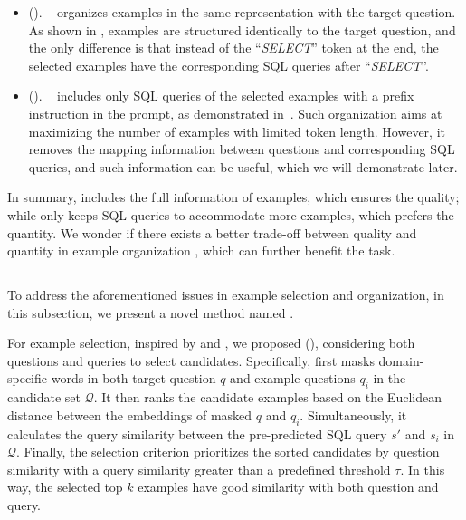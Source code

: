 \begin{itemize}
    \item \textbf{\fiorg} (\abfiorg). 
    \abfiorg~\cite{enhancing, DBLP:journals/corr/abs-2305-11853} organizes examples in the same representation with the target question.  
    As shown in , examples are structured identically to the target question, and the only difference is that instead of the ``\textit{SELECT}'' token at the end, the selected examples have the corresponding SQL queries after ``\textit{SELECT}''. 
    \item \textbf{\sqlorg} (\absqlorg).
    \absqlorg~\cite{DBLP:journals/corr/abs-2304-13301} includes only SQL queries of the selected examples with a prefix instruction in the prompt, as demonstrated in~.
    Such organization aims at maximizing the number of examples with limited token length. 
    However, it removes the mapping information between questions and corresponding SQL queries, and such information can be useful, which we will demonstrate later.
\end{itemize}

In summary, \abfiorg includes the full information of examples, which ensures the quality; 
while \absqlorg only keeps SQL queries to accommodate more examples, which prefers the quantity. 
We wonder if there exists a better trade-off between quality and quantity in example organization
, which can further benefit the \nlsql task.

\subsection{\ours}
\label{sec:dail-sql}
To address the aforementioned issues in example selection and organization, in this subsection, we present a novel \nlsql method named \ours. 

For example selection, inspired by \abslmselector and \abqrsselector, we proposed \textbf{\pqsselector} (\abpqsselector), considering both questions and queries to select candidates. 
Specifically, \pqsselector first masks domain-specific words in both target question $q$ and example questions $q_i$ in the candidate set $\mathcal{Q}$. 
It then ranks the candidate examples based on the Euclidean distance between the embeddings of masked $q$ and $q_i$. Simultaneously, it calculates the query similarity between the pre-predicted SQL query $s'$ and $s_i$ in $\mathcal{Q}$. 
Finally, the selection criterion prioritizes the sorted candidates by question similarity with a query similarity greater than a predefined threshold $\tau$. In this way, the selected top $k$ examples have good similarity with both question and query.

